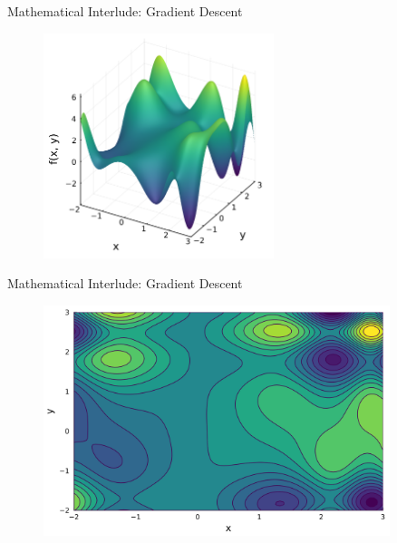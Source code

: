 \documentclass{beamer}
\begin{document}
\begin{frame}{Mathematical Interlude: Gradient Descent}
    \begin{figure}
        \centering
        \includegraphics[width=0.6\textwidth]{./images/06_gd_function.png}
    \end{figure}
\end{frame}

\begin{frame}{Mathematical Interlude: Gradient Descent}
    \begin{figure}
        \centering
        \includegraphics[width=0.9\textwidth]{./images/06_gd_contour.png}
    \end{figure}
\end{frame}
\end{document}

